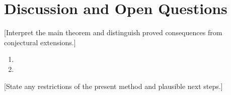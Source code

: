 \section{Discussion and Open Questions}
\label{sec:discussion}

[Interpret the main theorem and distinguish proved consequences from
conjectural extensions.]

\begin{enumerate}
  \item [First concrete open question.]
  \item [Second concrete open question.]
\end{enumerate}

[State any restrictions of the present method and plausible next steps.]
